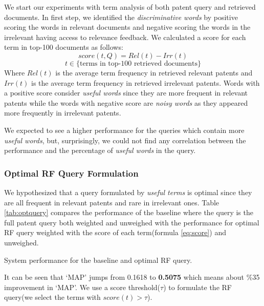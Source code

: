 \documentclass{sig-alternate}
\begin{document}
We start our experiments with term analysis of both patent query and retrieved documents. In first step, we identified the {\em discriminative words} by positive scoring the words in relevant documents and negative scoring the words in the irrelevant having access to relevance feedback. We calculated a score for each term in top-100 documents as follows:
\begin{equation}
score(t,Q)=Rel(t)-Irr(t) 
 \label{eq:score}
\end{equation}\vspace*{-6ex}
\begin{displaymath}t\in \lbrace \mbox{terms in top-100 retrieved documents}\rbrace\end{displaymath}
Where $ Rel(t) $ is the average term frequency in retrieved relevant patents and $ Irr(t) $ is the average term frequency in retrieved irrelevant patents. Words with a positive score consider {\em useful words} since they are more frequent in relevant patents while the words with negative score are {\em noisy words} as they appeared more frequently in irrelevant patents. 

We expected to see a higher performance for the queries which contain more {\em useful words}, but, surprisingly, we could not find any correlation between the performance and the percentage of {\em useful words} in the query. 

\subsubsection{Optimal RF Query Formulation}
We hypothesized that a query formulated by {\em useful terms} is optimal since they are all frequent in relevant patents and rare in irrelevant ones. Table \ref{tab:optquery} compares the performance of the baseline where the query is the full patent query both weighted and unweighed with the performance for optimal RF query weighted with the score of each term(formula \ref{eq:score}) and unweighed. 

\begin{table}[htpb]
  \begin{center}
   \caption{System performance for the baseline and optimal RF query.}
     
  \label{tab:optquery}
  \end{center}  
\end{table}

It can be seen that `MAP' jumps from 0.1618 to \textbf{0.5075} which means about \%35 improvement in `MAP'. We use a score threshold($\tau$) to formulate the RF query(we select the terms with $ score(t)>\tau $). 
\end{document}
